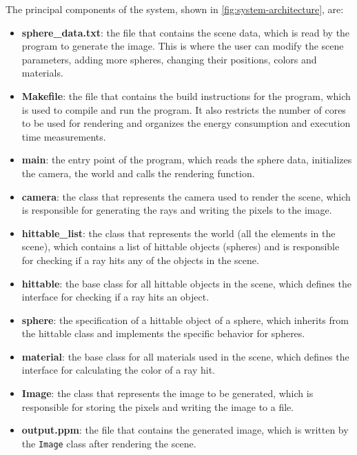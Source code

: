 The principal components of the system, shown in \autoref{fig:system-architecture}, are:
\begin{itemize}
    \item \textbf{sphere\_data.txt}: the file that contains the scene data, which is read by the program to generate the image. This is where the user can modify the scene parameters, adding more spheres, changing their positions, colors and materials.
    \item \textbf{Makefile}: the file that contains the build instructions for the program, which is used to compile and run the program. It also restricts the number of cores to be used for rendering and organizes the energy consumption and execution time measurements.
    \item \textbf{main}: the entry point of the program, which reads the sphere data, initializes the camera, the world and calls the rendering function.
    \item \textbf{camera}: the class that represents the camera used to render the scene, which is responsible for generating the rays and writing the pixels to the image.
    \item \textbf{hittable\_list}: the class that represents the world (all the elements in the scene), which contains a list of hittable objects (spheres) and is responsible for checking if a ray hits any of the objects in the scene.
    \item \textbf{hittable}: the base class for all hittable objects in the scene, which defines the interface for checking if a ray hits an object.
    \item \textbf{sphere}: the specification of a hittable object of a sphere, which inherits from the hittable class and implements the specific behavior for spheres.
    \item \textbf{material}: the base class for all materials used in the scene, which defines the interface for calculating the color of a ray hit.
    \item \textbf{Image}: the class that represents the image to be generated, which is responsible for storing the pixels and writing the image to a file.
    \item \textbf{output.ppm}: the file that contains the generated image, which is written by the \texttt{Image} class after rendering the scene.
\end{itemize}